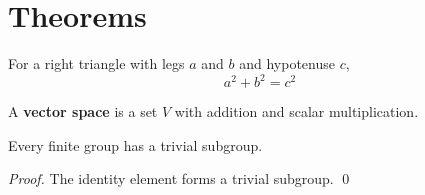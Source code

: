 

\chapter{Theorems}

\begin{theorem}
For a right triangle with legs $a$ and $b$ and hypotenuse $c$,
\begin{equation}
a^2 + b^2 = c^2
\end{equation}
\end{theorem}

\begin{definition}
A \textbf{vector space} is a set $V$ with addition and scalar multiplication.
\end{definition}

\begin{lemma}
Every finite group has a trivial subgroup.
\end{lemma}

\begin{proof}
The identity element forms a trivial subgroup. \qed
\end{proof}


